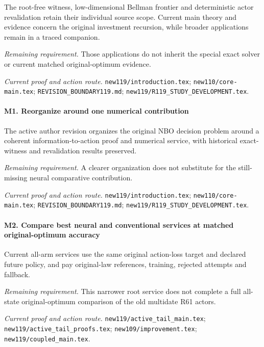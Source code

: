 The root-free witness, low-dimensional Bellman frontier and deterministic actor revalidation retain their individual source scope. Current main theory and evidence concern the original investment recursion, while broader applications remain in a traced companion.

\par\emph{Remaining requirement.} Those applications do not inherit the special exact solver or current matched original-optimum evidence.

\par\emph{Current proof and action route.} \nolinkurl{new119/introduction.tex}; \nolinkurl{new110/core-main.tex}; \nolinkurl{REVISION_BOUNDARY119.md}; \nolinkurl{new119/R119_STUDY_DEVELOPMENT.tex}.

\paragraph{M1. Reorganize around one numerical contribution}

The active author revision organizes the original NBO decision problem around a coherent information-to-action proof and numerical service, with historical exact-witness and revalidation results preserved.

\par\emph{Remaining requirement.} A clearer organization does not substitute for the still-missing neural comparative contribution.

\par\emph{Current proof and action route.} \nolinkurl{new119/introduction.tex}; \nolinkurl{new110/core-main.tex}; \nolinkurl{REVISION_BOUNDARY119.md}; \nolinkurl{new119/R119_STUDY_DEVELOPMENT.tex}.

\paragraph{M2. Compare best neural and conventional services at matched original-optimum accuracy}

Current all-arm services use the same original action-loss target and declared future policy, and pay original-law references, training, rejected attempts and fallback.

\par\emph{Remaining requirement.} This narrower root service does not complete a full all-state original-optimum comparison of the old multidate R61 actors.

\par\emph{Current proof and action route.} \nolinkurl{new119/active_tail_main.tex}; \nolinkurl{new119/active_tail_proofs.tex}; \nolinkurl{new109/improvement.tex}; \nolinkurl{new119/coupled_main.tex}.

